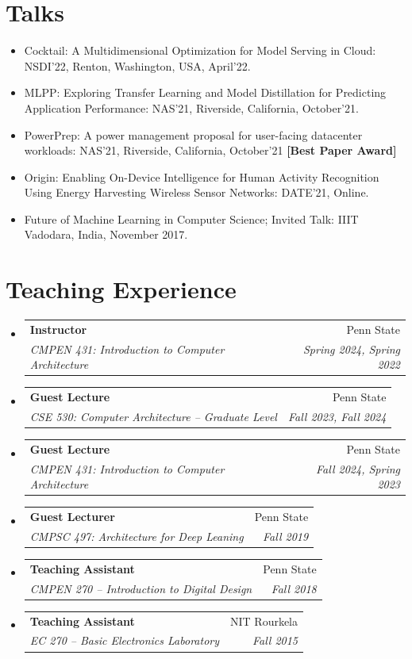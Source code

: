 \documentclass[letterpaper,11pt]{article}
\makeatletter
\newcommand{\resumeSubheading}[4]{
  \vspace{-2pt}\item
    \begin{tabular*}{0.97\textwidth}[t]{l@{\extracolsep{\fill}}r}
      \textbf{#1} & #2 \\
      \textit{\small#3} & \textit{\small#4} \\
    \end{tabular*}\vspace{-7pt}
}
\newcommand{\resumeSubHeadingListStart}{\begin{itemize}[leftmargin=0.15in, label={}]}
\newcommand{\resumeSubHeadingListEnd}{\end{itemize}}
\makeatother
\begin{document}
\section{Talks}

\begin{itemize}
    \item Cocktail: A Multidimensional Optimization for Model Serving in Cloud: NSDI'22, Renton, Washington, USA, April'22. \href{https://youtu.be/VAsB1XBuRZ0}{\faYoutubePlay}
    \item MLPP: Exploring Transfer Learning and Model Distillation for Predicting Application Performance: NAS'21, Riverside, California, October'21.
    \item PowerPrep: A power management proposal for user-facing datacenter workloads: NAS'21, Riverside, California, October'21  \textbf{[Best Paper Award]}   
    \item Origin: Enabling On-Device Intelligence for Human Activity Recognition Using Energy Harvesting Wireless Sensor Networks: DATE'21, Online. \href{https://drive.google.com/file/d/1zM1oaPxZSWI2VyBMHivl1utpkjMVrACI/view?usp=sharing}{\faYoutubePlay} 
    \item Future of Machine Learning in Computer Science; Invited Talk: IIIT Vadodara, India, November 2017.

\end{itemize}



\section{Teaching Experience}
 \resumeSubHeadingListStart
\resumeSubheading
    {Instructor}{Penn State}
    {CMPEN 431: Introduction to Computer Architecture} {Spring 2024, Spring 2022}
 \resumeSubheading
    {Guest Lecture}{Penn State}
    {CSE 530: Computer Architecture -- Graduate Level} {Fall 2023, Fall 2024}
\resumeSubheading
    {Guest Lecture}{Penn State}
    {CMPEN 431: Introduction to Computer Architecture} {Fall 2024, Spring 2023}

\resumeSubheading
    {Guest Lecturer}{Penn State}
    {CMPSC 497: Architecture for Deep Leaning} {Fall 2019}
\resumeSubheading
      {Teaching Assistant}{Penn State}
      {CMPEN 270 -- Introduction to Digital Design}{Fall 2018}
\resumeSubheading
    {Teaching Assistant}{NIT Rourkela}
    {EC 270 -- Basic Electronics Laboratory}{Fall 2015}
\resumeSubHeadingListEnd
\end{document}
